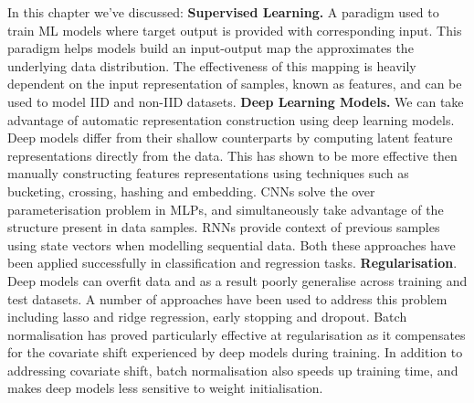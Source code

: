 In this chapter we've discussed: \newline
\textbf{Supervised Learning.} A paradigm used to train ML models where target output is provided with corresponding input. This paradigm helps models build an input-output map the approximates the underlying data distribution. The effectiveness of this mapping is heavily dependent on the input representation of samples, known as features, and can be used to model IID and non-IID datasets. \newline
\textbf{Deep Learning Models.} We can take advantage of automatic representation construction using deep learning models. Deep models differ from their shallow counterparts by computing latent feature representations directly from the data. This has shown to be more effective then manually constructing features representations using techniques such as bucketing, crossing, hashing and embedding. CNNs solve the over parameterisation problem in MLPs, and simultaneously take advantage of the structure present in data samples. RNNs provide context of previous samples using state vectors when modelling sequential data. Both these approaches have been applied successfully in classification and regression tasks. \newline
\textbf{Regularisation}. Deep models can overfit data and as a result poorly generalise across training and test datasets. A number of approaches have been used to address this problem including lasso and ridge regression, early stopping and dropout. Batch normalisation has proved particularly effective at regularisation as it compensates for the covariate shift experienced by deep models during training. In addition to addressing covariate shift, batch normalisation also speeds up training time, and makes deep models less sensitive to weight initialisation.
